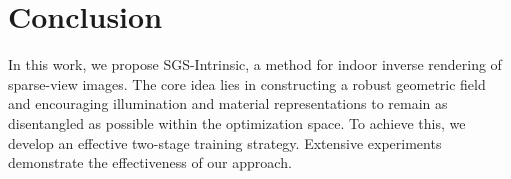 \section{Conclusion}

In this work, we propose SGS-Intrinsic, a method for indoor inverse rendering of sparse-view images. The core idea lies in constructing a robust geometric field and encouraging illumination and material representations to remain as disentangled as possible within the optimization space. To achieve this, we develop an effective two-stage training strategy. Extensive experiments demonstrate the effectiveness of our approach.
